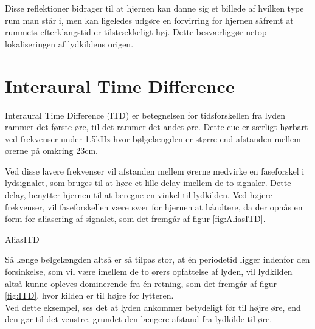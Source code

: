 Disse reflektioner bidrager til at hjernen kan danne sig et billede af hvilken type rum man står i, men kan ligeledes udgøre en forvirring for hjernen såfremt at rummets efterklangstid er tilstrækkeligt høj. Dette besværliggør netop lokaliseringen af lydkildens origen. 



\section{Interaural Time Difference}

Interaural Time Difference (ITD) er betegnelsen for tidsforskellen fra lyden rammer det første øre, til det rammer det andet øre. Dette cue er særligt hørbart ved frekvenser under 1.5kHz hvor bølgelængden er større end afstanden mellem ørerne på omkring 23cm. 
%

Ved disse lavere frekvenser vil afstanden mellem ørerne medvirke en faseforskel i lydsignalet, som bruges til at høre et lille delay imellem de to signaler. Dette delay, benytter hjernen til at beregne en vinkel til lydkilden. Ved højere frekvenser, vil faseforskellen være svær for hjernen at håndtere, da der opnås en form for aliasering af signalet, som det fremgår af figur \ref{fig:AliasITD}.

 {AliasITD}

Så længe bølgelængden altså er så tilpas stor, at én periodetid ligger indenfor den forsinkelse, som vil være imellem de to ørers opfattelse af lyden, vil lydkilden altså kunne opleves dominerende fra én retning, som det fremgår af figur \ref{fig:ITD}, hvor kilden er til højre for lytteren. \\
Ved dette eksempel, ses det at lyden ankommer betydeligt før til højre øre, end den gør til det venstre, grundet den længere afstand fra lydkilde til øre.\\

